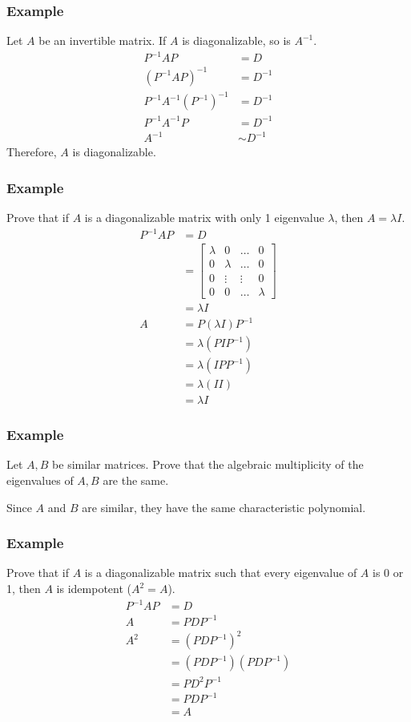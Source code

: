 \documentclass{math}
\begin{document}
\subsubsection*{Example}
Let \( A \) be an invertible matrix. If \( A \) is diagonalizable, so is
\( A^{-1} \).
\begin{align*}
  P^{-1}AP &= D \\
  (P^{-1}AP)^{-1} &= D^{-1} \\
  P^{-1}A^{-1}(P^{-1})^{-1} &= D^{-1} \\
  P^{-1}A^{-1}P &= D^{-1} \\
  A^{-1} &\sim D^{-1}
\end{align*}
Therefore, \( A \) is diagonalizable.

\subsubsection*{Example}
Prove that if \( A \) is a diagonalizable matrix with only 1 eigenvalue
\( \lambda \), then \( A = \lambda I \).
\begin{align*}
  P^{-1}AP &= D \\
  &= \begin{bmatrix}
    \lambda & 0 & \dots & 0 \\
    0 & \lambda & \dots & 0 \\
    0 & \vdots & \vdots & 0 \\
    0 & 0 & \dots & \lambda
  \end{bmatrix} \\
  &= \lambda I \\
  A &= P(\lambda I)P^{-1} \\
  &= \lambda(PIP^{-1}) \\
  &= \lambda(IPP^{-1}) \\
  &= \lambda(II) \\
  &= \lambda I
\end{align*}

\subsubsection*{Example}
Let \( A,B \) be similar matrices. Prove that the algebraic multiplicity of the
eigenvalues of \( A,B \) are the same. \par
Since \( A \) and \( B \) are similar, they have the same characteristic
polynomial.

\subsubsection*{Example}
Prove that if \( A \) is a diagonalizable matrix such that every eigenvalue of
\( A \) is 0 or 1, then \( A \) is idempotent (\( A^2 = A \)).
\begin{align*}
  P^{-1}AP &= D \\
  A &= PDP^{-1} \\
  A^2 &= (PDP^{-1})^2 \\
  &= (PDP^{-1})(PDP^{-1}) \\
  &= PD^2P^{-1} \\
  &= PDP^{-1} \\
  &= A
\end{align*}
\end{document}
